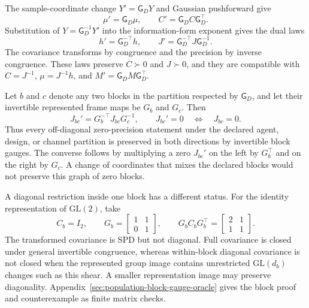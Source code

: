 The sample-coordinate change \(Y'=\mathsf G_DY\) and Gaussian pushforward give
\begin{equation}
\mu'=\mathsf G_D\mu,
\qquad
C'=\mathsf G_DC\mathsf G_D^\top.
\label{eq:population-moment-gauge-laws}
\end{equation}
Substitution of \(Y=\mathsf G_D^{-1}Y'\) into the information-form exponent gives the dual laws
\begin{equation}
h'=\mathsf G_D^{-\top}h,
\qquad
J'=\mathsf G_D^{-\top}J\mathsf G_D^{-1}.
\label{eq:population-information-gauge-laws}
\end{equation}
The covariance transforms by congruence and the precision by inverse congruence. These laws preserve \(C\succ0\) and \(J\succ0\), and they are compatible with \(C=J^{-1}\), \(\mu=J^{-1}h\), and \(M'= \mathsf G_DM\mathsf G_D^\top\).

Let \(b\) and \(c\) denote any two blocks in the partition respected by \(\mathsf G_D\), and let their invertible represented frame maps be \(G_b\) and \(G_c\). Then
\begin{equation}
J_{bc}'=G_b^{-\top}J_{bc}G_c^{-1},
\qquad
J_{bc}'=0\quad\Longleftrightarrow\quad J_{bc}=0.
\label{eq:block-zero-precision-gauge-invariance}
\end{equation}
Thus every off-diagonal zero-precision statement under the declared agent, design, or channel partition is preserved in both directions by invertible block gauges. The converse follows by multiplying a zero \(J_{bc}'\) on the left by \(G_b^\top\) and on the right by \(G_c\). A change of coordinates that mixes the declared blocks would not preserve this graph of zero blocks.

A diagonal restriction inside one block has a different status. For the identity representation of \(\mathrm{GL}(2)\), take
\begin{equation}
C_b=I_2,
\qquad
G_b=
\begin{bmatrix}
1&1\\
0&1
\end{bmatrix},
\qquad
G_bC_bG_b^\top=
\begin{bmatrix}
2&1\\
1&1
\end{bmatrix}.
\label{eq:diagonal-covariance-gauge-counterexample}
\end{equation}
The transformed covariance is SPD but not diagonal. Full covariance is closed under general invertible congruence, whereas within-block diagonal covariance is not closed when the represented group image contains unrestricted \(\mathrm{GL}(d_b)\) changes such as this shear. A smaller representation image may preserve diagonality. Appendix~\ref{sec:population-block-gauge-oracle} gives the block proof and counterexample as finite matrix checks.

